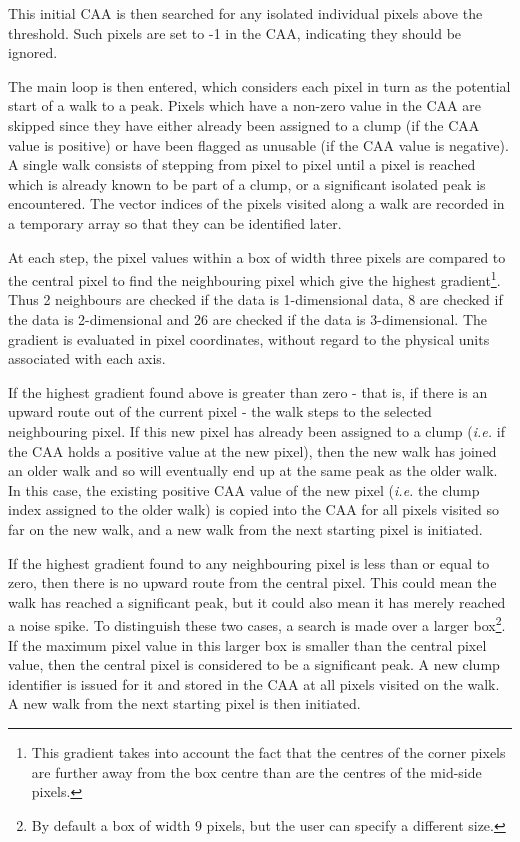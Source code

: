 \documentclass[final,authoryear,5p,times,twocolumn]{elsarticle}
\begin{document}
This initial CAA is then searched for any isolated individual pixels
above the threshold. Such pixels are set to -1 in the CAA, indicating
they should be ignored.

The main loop is then entered, which considers each pixel in turn as the
potential start of a walk to a peak. Pixels which have a non-zero value
in the CAA are skipped since they have either already been assigned to a
clump (if the CAA value is positive) or have been flagged as unusable (if
the CAA value is negative). A single walk consists of stepping from pixel
to pixel until a pixel is reached which is already known to be part of a
clump, or a significant isolated peak is encountered. The vector indices of
the pixels visited along a walk are recorded in a temporary array so that
they  can be identified later.

At each step, the pixel values within a box of width three pixels are compared
to the central pixel to find the neighbouring pixel which give the highest
gradient\footnote{This gradient takes into account the fact that the
centres of the corner pixels are further away from the box centre than
are the centres of the mid-side pixels.}. Thus 2 neighbours are checked if
the data is 1-dimensional data, 8 are checked if the data is 2-dimensional
and 26 are checked if the data is 3-dimensional. The gradient is
evaluated in pixel coordinates, without regard to the physical units
associated with each axis.

If the highest gradient found above is greater than zero - that is, if
there is an upward route out of the current pixel - the walk steps to the
selected neighbouring pixel. If this new pixel has already been assigned
to a clump (\emph{i.e.} if the CAA holds a positive value at the new
pixel), then the new walk has joined an older walk and so will eventually
end up at the same peak as the older walk. In this case, the existing
positive CAA value of the new pixel (\emph{i.e.} the clump index assigned
to the older walk) is copied into the CAA for all pixels visited so far
on the new walk, and a new walk from the next starting pixel is
initiated.

If the highest gradient found to any neighbouring pixel is less than or
equal to zero, then there is no upward route from the central pixel. This
could mean the walk has reached a significant peak, but it could also
mean it has merely reached a noise spike. To distinguish these two cases,
a search is made over a larger box\footnote{By default a box of width 9
pixels, but the user can specify a different size.}. If the maximum pixel
value in this larger box is smaller than the central pixel value, then
the central pixel is considered to be a significant peak. A new clump
identifier is issued for it and stored in the CAA at all pixels visited
on the walk. A new walk from the next starting pixel is then initiated.
\end{document}
